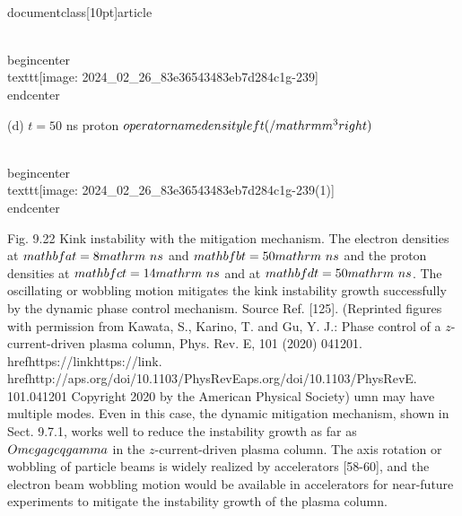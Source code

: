 \\documentclass[10pt]{article}
\begin{document}
{{{{{{\\begin{center}
\\texttt{[image: 2024\_02\_26\_83e36543483eb7d284c1g-239]}
\\end{center}

(d) $t=50$ ns proton $\\operatorname{density}\\left(/ \\mathrm{m}^{3}\\right)$

\\begin{center}
\\texttt{[image: 2024\_02\_26\_83e36543483eb7d284c1g-239(1)]}
\\end{center}

Fig. 9.22 Kink instability with the mitigation mechanism. The electron densities at $\\mathbf{a} t=8 \\mathrm{~ns}$ and $\\mathbf{b} t=50 \\mathrm{~ns}$ and the proton densities at $\\mathbf{c} t=14 \\mathrm{~ns}$ and at $\\mathbf{d} t=50 \\mathrm{~ns}$. The oscillating or wobbling motion mitigates the kink instability growth successfully by the dynamic phase control mechanism. Source Ref. [125]. (Reprinted figures with permission from Kawata, S., Karino, T. and Gu, Y. J.: Phase control of a $z$-current-driven plasma column, Phys. Rev. E, 101 (2020) 041201. \\href{https://link}{https://link}. \\href{http://aps.org/doi/10.1103/PhysRevE}{aps.org/doi/10.1103/PhysRevE}. 101.041201 Copyright 2020 by the American Physical Society)
umn may have multiple modes. Even in this case, the dynamic mitigation mechanism, shown in Sect. 9.7.1, works well to reduce the instability growth as far as $\\Omega \\geq \\gamma$ in the $z$-current-driven plasma column. The axis rotation or wobbling of particle beams is widely realized by accelerators [58-60], and the electron beam wobbling motion would be available in accelerators for near-future experiments to mitigate the instability growth of the plasma column.

}}}}}}
\end{document}
